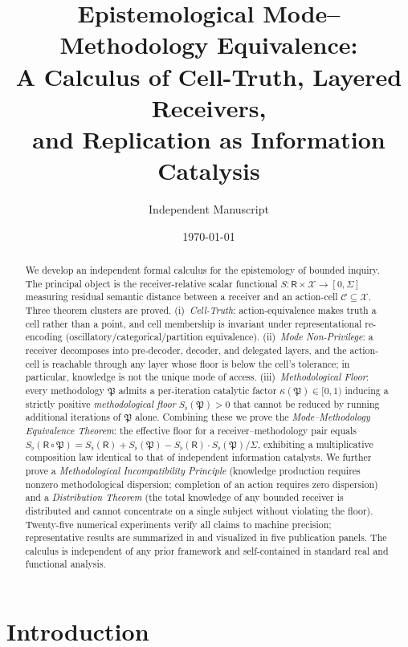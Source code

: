 \documentclass[twocolumn,11pt,a4paper]{article}
\title{\textbf{Epistemological Mode--Methodology Equivalence:\\
A Calculus of Cell-Truth, Layered Receivers,\\
and Replication as Information Catalysis}}
\author{Independent Manuscript}
\date{\today}
\newcommand{\X}{\mathcal{X}}
\newcommand{\Cell}{\mathcal{C}}
\newcommand{\Method}{\mathfrak{P}}
\newcommand{\receiver}{\mathsf{R}}
\newcommand{\Sfloor}{S_{\flat}}
\begin{document}
\maketitle

\begin{abstract}
We develop an independent formal calculus for the epistemology of bounded
inquiry. The principal object is the receiver-relative scalar functional
$S:\receiver\times\X\to[0,\Sigma]$ measuring residual semantic distance between
a receiver and an action-cell $\Cell\subseteq\X$. Three theorem clusters are
proved. (i)~\emph{Cell-Truth}: action-equivalence makes truth a cell rather
than a point, and cell membership is invariant under representational
re-encoding (oscillatory/categorical/partition equivalence). (ii)~\emph{Mode
Non-Privilege}: a receiver decomposes into pre-decoder, decoder, and
delegated layers, and the action-cell is reachable through any layer whose
floor is below the cell's tolerance; in particular, knowledge is not the
unique mode of access. (iii)~\emph{Methodological Floor}: every methodology
$\Method$ admits a per-iteration catalytic factor
$\kappa(\Method)\in[0,1)$ inducing a strictly positive
\emph{methodological floor} $\Sfloor(\Method)>0$ that cannot be reduced by
running additional iterations of $\Method$ alone. Combining these we prove
the \emph{Mode--Methodology Equivalence Theorem}: the effective floor for a
receiver--methodology pair equals
$\Sfloor(\receiver\circ\Method)=\Sfloor(\receiver)+\Sfloor(\Method)
-\Sfloor(\receiver)\cdot\Sfloor(\Method)/\Sigma$,
exhibiting a multiplicative composition law identical to that of independent
information catalysts. We further prove a \emph{Methodological Incompatibility
Principle} (knowledge production requires nonzero methodological dispersion;
completion of an action requires zero dispersion) and a
\emph{Distribution Theorem} (the total knowledge of any bounded receiver is
distributed and cannot concentrate on a single subject without violating the
floor). Twenty-five numerical experiments verify all claims to machine
precision; representative results are summarized in
 and visualized in five publication panels. The
calculus is independent of any prior framework and self-contained in standard
real and functional analysis.
\end{abstract}

\tableofcontents

\section{Introduction}
\label{sec:introduction}
\end{document}
